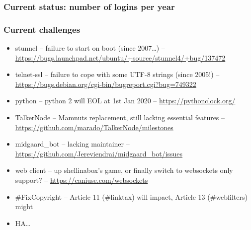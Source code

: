 \documentclass[aspectratio=169]{beamer}
\begin{document}
\begin{frame}
\frametitle{Current status: number of logins per year}
\end{frame}

\begin{frame}
\frametitle{Current challenges}
  \begin{itemize}
     \item{} stunnel -- failure to start on boot (since 2007\ldots) -- \url{https://bugs.launchpad.net/ubuntu/+source/stunnel4/+bug/137472}
     \item{} telnet-ssl -- failure to cope with some UTF-8 strings (since 2005!) -- \url{https://bugs.debian.org/cgi-bin/bugreport.cgi?bug=749322}
     \item{} python -- python 2 will EOL at 1st Jan 2020 -- \url{https://pythonclock.org/}
     \item{} TalkerNode -- Mamnuts replacement, still lacking essential features -- \url{https://github.com/marado/TalkerNode/milestones}
     \item{} midgaard\_bot -- lacking maintainer -- \url{https://github.com/Jereviendrai/midgaard\_bot/issues}
     \item{} web client -- up shellinabox's game, or finally switch to websockets only support? -- \url{https://caniuse.com/websockets}
     \item{} \#FixCopyright -- Article 11 (\#linktax) will impact, Article 13 (\#webfilters) might
     \item{} HA\ldots
  \end{itemize}
\end{frame}

\end{document}
